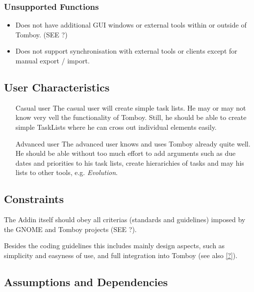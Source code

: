     \subsubsection*{Unsupported Functions}
      \label{description:functions:unsupported}
      \begin{itemize}
        \item Does not have additional GUI windows or external tools within or outside of Tomboy. (SEE ?) %
        \item Does not support synchronisation with external tools or clients except for manual export / import.
      \end{itemize}

\subsection{User Characteristics}
\label{description:usercharacteristics}

  \begin{itemize}
    \item[Casual user] The casual user will create simple task lists. He may or may not know very vell the functionality of Tomboy. Still, he should be able to create simple TaskLists where he can cross out individual elements easily.

    \item [Advanced user] The advanced user knows and uses Tomboy already quite well. He should be able without too much effort to add arguments such as due dates and priorities to his task lists, create hierarichies of tasks and may his lists to other tools, e.g. \textit{Evolution}.
  \end{itemize}


\subsection{Constraints}
\label{description:constraints}
The Addin itself should obey all criterias (standards and guidelines) imposed by the GNOME and Tomboy projects (SEE ?). %

Besides the coding guidelines this includes mainly design aspects, such as simplicity and easyness of use, and full integration into Tomboy (see also \ref{?}).


\subsection{Assumptions and Dependencies}
\label{description:assumptions}

